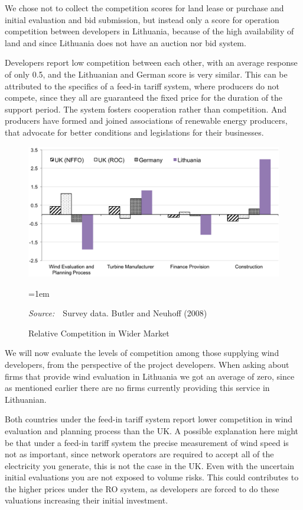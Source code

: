 \documentclass[a4paper, 12pt]{article}
\newcommand{\Figtext}[1]{%
	\begin{tablenotes}[para,flushleft]
		\hangindent=1em
		\footnotesize
		\raggedright
		#1
	\end{tablenotes}
}
\newcommand{\Figsource}[1]{\Figtext{\emph{Source:~}~#1}}
\begin{document}
We chose not to collect the competition scores for land lease or purchase and initial evaluation and bid submission, but instead only a score for operation competition between developers in Lithuania, because of the high availability of land and since Lithuania does not have an auction nor bid system.

Developers report low competition between each other, with an average response of only 0.5, and the Lithuanian and German score is very similar. This can be attributed to the specifics of a feed-in tariff system, where producers do not compete, since they all are guaranteed the fixed price for the duration of the support period. The system fosters cooperation rather than competition. And producers have formed and joined associations of renewable energy producers, that advocate for better conditions and legislations for their businesses. 

\begin{figure}
	\centering
	\caption{Relative Competition in Wider Market}
	\includegraphics[width=1\textwidth]{fig_survey_suppliers}
	\Figsource{Survey data. Butler and Neuhoff (2008)}
	\label{fig:fig_survey_suppliers}
\end{figure}

We will now evaluate the levels of competition among those supplying wind developers, from the perspective of the project developers. When asking about firms that provide wind evaluation in Lithuania we got an average of zero, since as mentioned earlier there are no firms currently providing this service in Lithuanian. 

Both countries under the feed-in tariff system report lower competition in wind evaluation and planning process than the UK. A possible explanation here might be that under a feed-in tariff system the precise measurement of wind speed is not as important, since network operators are required to accept all of the electricity you generate, this is not the case in the UK. Even with the uncertain initial evaluations you are not exposed to volume risks. This could contributes to the higher prices under the RO system, as developers are forced to do these valuations increasing their initial investment.
\end{document}
